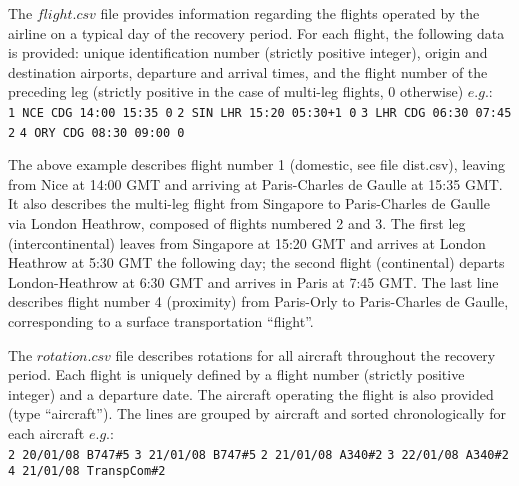 \documentclass[ijoo,nonblindrev]{informs-ijoo}
\begin{document}
The $flight.csv$ file provides information regarding the flights operated by the airline on a typical day of the recovery period. For each flight, the following data is provided: unique identification number (strictly positive integer), origin and destination airports, departure and arrival times, and the flight number of the preceding leg (strictly positive in the case of multi-leg flights, 0 otherwise) $e.g.$:\\
\newline
{\texttt{\footnotesize 1 NCE CDG 14:00 15:35 0}}
\newline
{\texttt{\footnotesize 2 SIN LHR 15:20 05:30+1 0}}
\newline
{\texttt{\footnotesize 3 LHR CDG 06:30 07:45 2}}
\newline
{\texttt{\footnotesize 4 ORY CDG 08:30 09:00 0}}
\newline

The above example describes flight number 1 (domestic, see file dist.csv), leaving from Nice at 14:00 GMT and arriving at Paris-Charles de Gaulle at 15:35 GMT. It also describes the multi-leg flight from Singapore to Paris-Charles de Gaulle via London Heathrow, composed of flights numbered 2 and 3. The first leg (intercontinental) leaves from Singapore at 15:20 GMT and arrives at London Heathrow at 5:30 GMT the following day; the second flight (continental) departs London-Heathrow at 6:30 GMT and arrives in Paris at 7:45 GMT. The last line describes flight number 4 (proximity) from Paris-Orly to Paris-Charles de Gaulle, corresponding to a surface transportation “flight”.

The $rotation.csv $ file describes rotations for all aircraft throughout the recovery period. Each flight is uniquely defined by a flight number (strictly positive integer) and a departure date. The aircraft operating the flight is also provided (type “aircraft”). The lines are grouped by aircraft and sorted chronologically for each aircraft $e.g.$:\\
\newline
{\texttt{\footnotesize 2 20/01/08 B747\#5}}
\newline
{\texttt{\footnotesize 3 21/01/08 B747\#5}}
\newline
{\texttt{\footnotesize 2 21/01/08 A340\#2}}
\newline
{\texttt{\footnotesize 3 22/01/08 A340\#2}}
\newline
{\texttt{\footnotesize 4 21/01/08 TranspCom\#2}}
\newline
\end{document}
